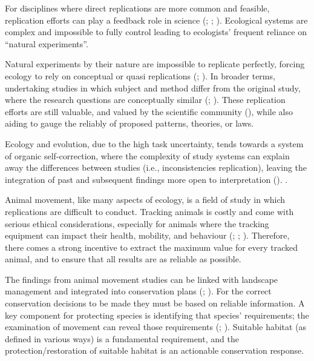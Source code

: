 \documentclass[10pt,a4paper]{article}
\begin{document}
For disciplines where direct replications are more common and feasible, replication efforts can play a feedback role in science (; ; ).
Ecological systems are complex and impossible to fully control leading to ecologists' frequent reliance on ``natural experiments''.

Natural experiments by their nature are impossible to replicate perfectly, forcing ecology to rely on conceptual or quasi replications (; ).
In broader terms, undertaking studies in which subject and method differ from the original study, where the research questions are conceptually similar (; ).
These replication efforts are still valuable, and valued by the scientific community (), while also aiding to gauge the reliably of proposed patterns, theories, or laws.

Ecology and evolution, due to the high task uncertainty, tends towards a system of organic self-correction, where the complexity of study systems can explain away the differences between studies (i.e., inconsistencies replication), leaving the integration of past and subsequent findings more open to interpretation (). .

Animal movement, like many aspects of ecology, is a field of study in which replications are difficult to conduct.
Tracking animals is costly and come with serious ethical considerations, especially for animals where the tracking equipment can impact their health, mobility, and behaviour (; ; ).
Therefore, there comes a strong incentive to extract the maximum value for every tracked animal, and to ensure that all results are as reliable as possible.

The findings from animal movement studies can be linked with landscape management and integrated into conservation plans (; ).
For the correct conservation decisions to be made they must be based on reliable information.
A key component for protecting species is identifying that species' requirements; the examination of movement can reveal those requirements (; ).
Suitable habitat (as defined in various ways) is a fundamental requirement, and the protection/restoration of suitable habitat is an actionable conservation response.
\end{document}

